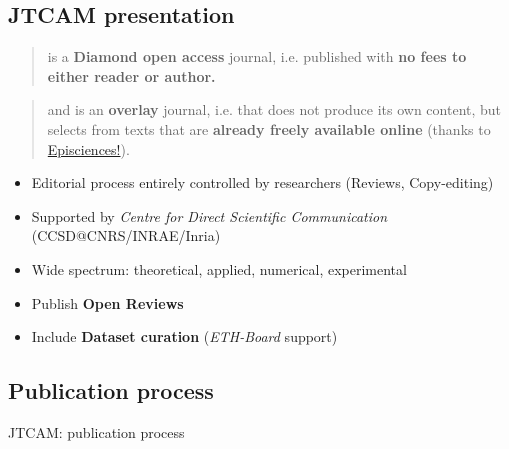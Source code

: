 \documentclass[10pt,compress,serif,aspectratio=169]{beamer}
\begin{document}
\subsection{JTCAM presentation}
\begin{frame}[t]{}

\newline

  \begin{quote}
    is a {\huge \textbf{Diamond open access}} journal, i.e. published with \textbf{no fees to either reader or author.} \newline
\end{quote}

  \begin{quote}
      and is an {\huge \textbf{overlay}} journal, i.e. that does not produce its own content, but selects from texts that are \textbf{already freely available online} (thanks to \href{https://www.episciences.org/}{Episciences!}).
\newline
\end{quote}

\pause

 \begin{itemize}
 \item Editorial process entirely controlled by researchers (Reviews, Copy-editing)
 \item Supported by \textit{Centre for Direct Scientific Communication} (CCSD@CNRS/INRAE/Inria)
 \item Wide spectrum: theoretical, applied, numerical, experimental
 \pause
 \item Publish \textbf{Open Reviews}
 \item Include \textbf{Dataset curation} (\textit{ETH-Board} support)
 \end{itemize}
\end{frame}


\subsection{Publication process}
\begin{frame}[t]{JTCAM: publication process}
 \begin{center}%
 \end{center}%
\end{frame}
 
\end{document}
